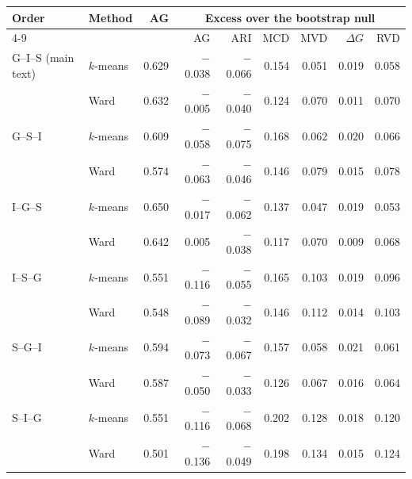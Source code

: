 \begin{tabular}{llrrrrrrr}
\toprule
Order & Method & AG & \multicolumn{6}{c}{Excess over the bootstrap null} \\
\cmidrule(lr){4-9}
 & & & AG & ARI & MCD & MVD & $\Delta G$ & RVD \\
\midrule
G--I--S (main text) & $k$-means & 0.629 & $-$0.038 & $-$0.066 & 0.154 & 0.051 & 0.019 & 0.058 \\
 & Ward & 0.632 & $-$0.005 & $-$0.040 & 0.124 & 0.070 & 0.011 & 0.070 \\
\addlinespace
G--S--I & $k$-means & 0.609 & $-$0.058 & $-$0.075 & 0.168 & 0.062 & 0.020 & 0.066 \\
 & Ward & 0.574 & $-$0.063 & $-$0.046 & 0.146 & 0.079 & 0.015 & 0.078 \\
\addlinespace
I--G--S & $k$-means & 0.650 & $-$0.017 & $-$0.062 & 0.137 & 0.047 & 0.019 & 0.053 \\
 & Ward & 0.642 & 0.005 & $-$0.038 & 0.117 & 0.070 & 0.009 & 0.068 \\
\addlinespace
I--S--G & $k$-means & 0.551 & $-$0.116 & $-$0.055 & 0.165 & 0.103 & 0.019 & 0.096 \\
 & Ward & 0.548 & $-$0.089 & $-$0.032 & 0.146 & 0.112 & 0.014 & 0.103 \\
\addlinespace
S--G--I & $k$-means & 0.594 & $-$0.073 & $-$0.067 & 0.157 & 0.058 & 0.021 & 0.061 \\
 & Ward & 0.587 & $-$0.050 & $-$0.033 & 0.126 & 0.067 & 0.016 & 0.064 \\
\addlinespace
S--I--G & $k$-means & 0.551 & $-$0.116 & $-$0.068 & 0.202 & 0.128 & 0.018 & 0.120 \\
 & Ward & 0.501 & $-$0.136 & $-$0.049 & 0.198 & 0.134 & 0.015 & 0.124 \\
\bottomrule
\end{tabular}
